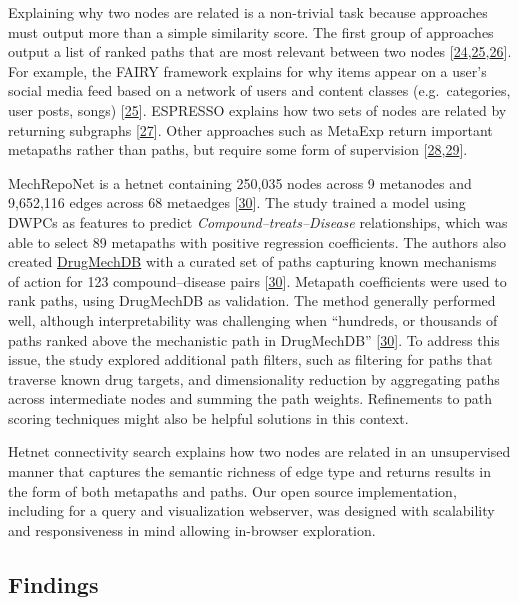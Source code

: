 Explaining why two nodes are related is a non-trivial task because approaches must output more than a simple similarity score.
The first group of approaches output a list of ranked paths that are most relevant between two nodes {[}\protect\hyperlink{ref-Dbie18xe}{24},\protect\hyperlink{ref-GPBbIfq9}{25},\protect\hyperlink{ref-L3DO8oq1}{26}{]}.
For example, the FAIRY framework explains for why items appear on a user's social media feed based on a network of users and content classes (e.g.~categories, user posts, songs) {[}\protect\hyperlink{ref-GPBbIfq9}{25}{]}.
ESPRESSO explains how two sets of nodes are related by returning subgraphs {[}\protect\hyperlink{ref-Hf24Hzrl}{27}{]}.
Other approaches such as MetaExp return important metapaths rather than paths,
but require some form of supervision {[}\protect\hyperlink{ref-19H7j1WBd}{28},\protect\hyperlink{ref-Vz9QIDKV}{29}{]}.

MechRepoNet is a hetnet containing 250,035 nodes across 9 metanodes and 9,652,116 edges across 68 metaedges {[}\protect\hyperlink{ref-KQNSDt1L}{30}{]}.
The study trained a model using DWPCs as features to predict \emph{Compound--treats--Disease} relationships,
which was able to select 89 metapaths with positive regression coefficients.
The authors also created \href{https://sulab.github.io/DrugMechDB/}{DrugMechDB} with a curated set of paths capturing known mechanisms of action for 123 compound--disease pairs {[}\protect\hyperlink{ref-KQNSDt1L}{30}{]}.
Metapath coefficients were used to rank paths, using DrugMechDB as validation.
The method generally performed well, although interpretability was challenging when ``hundreds, or thousands of paths ranked above the mechanistic path in DrugMechDB'' {[}\protect\hyperlink{ref-KQNSDt1L}{30}{]}.
To address this issue, the study explored additional path filters, such as filtering for paths that traverse known drug targets, and dimensionality reduction by aggregating paths across intermediate nodes and summing the path weights.
Refinements to path scoring techniques might also be helpful solutions in this context.

Hetnet connectivity search explains how two nodes are related in an unsupervised manner that captures the semantic richness of edge type and returns results in the form of both metapaths and paths.
Our open source implementation, including for a query and visualization webserver, was designed with scalability and responsiveness in mind allowing in-browser exploration.

\hypertarget{findings}{%
\subsection{Findings}\label{findings}}

